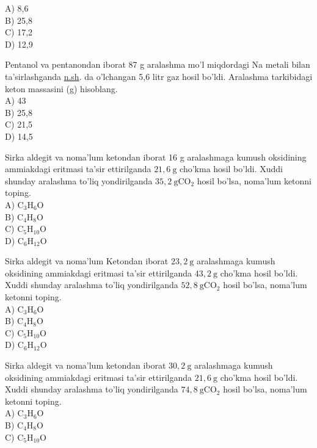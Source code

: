 A) 8,6\\
B) 25,8\\
C) 17,2\\
D) 12,9
  \item Pentanol va pentanondan iborat 87 g aralashma mo'l miqdordagi Na metali bilan ta'sirlashganda \href{http://n.sh}{n.sh}. da o'lchangan 5,6 litr gaz hosil bo'ldi. Aralashma tarkibidagi keton massasini (g) hisoblang.\\
A) 43\\
B) 25,8\\
C) 21,5\\
D) 14,5
  \item Sirka aldegit va noma'lum ketondan iborat 16 g aralashmaga kumush oksidining ammiakdagi eritmasi ta'sir ettirilganda $21,6 \mathrm{~g}$ cho'kma hosil bo'ldi. Xuddi shunday aralashma to'liq yondirilganda $35,2 \mathrm{~g} \mathrm{CO}_{2}$ hosil bo'lsa, noma'lum ketonni toping.\\
A) $\mathrm{C}_{3} \mathrm{H}_{6} \mathrm{O}$\\
B) $\mathrm{C}_{4} \mathrm{H}_{8} \mathrm{O}$\\
C) $\mathrm{C}_{5} \mathrm{H}_{10} \mathrm{O}$\\
D) $\mathrm{C}_{6} \mathrm{H}_{12} \mathrm{O}$
  \item Sirka aldegit va noma'lum Ketondan iborat $23,2 \mathrm{~g}$ aralashmaga kumush oksidining ammiakdagi eritmasi ta'sir ettirilganda $43,2 \mathrm{~g}$ cho'kma hosil bo'ldi. Xuddi shunday aralashma to'liq yondirilganda $52,8 \mathrm{~g} \mathrm{CO}_{2}$ hosil bo'lsa, noma'lum ketonni toping.\\
A) $\mathrm{C}_{3} \mathrm{H}_{6} \mathrm{O}$\\
B) $\mathrm{C}_{4} \mathrm{H}_{8} \mathrm{O}$\\
C) $\mathrm{C}_{5} \mathrm{H}_{10} \mathrm{O}$\\
D) $\mathrm{C}_{6} \mathrm{H}_{12} \mathrm{O}$
  \item Sirka aldegit va noma'lum ketondan iborat $30,2 \mathrm{~g}$ aralashmaga kumush oksidining ammiakdagi eritmasi ta'sir ettirilganda $21,6 \mathrm{~g}$ cho'kma hosil bo'ldi. Xuddi shunday aralashma to'liq yondirilganda $74,8 \mathrm{~g} \mathrm{CO}_{2}$ hosil bo'lsa, noma'lum ketonni toping.\\
A) $\mathrm{C}_{3} \mathrm{H}_{6} \mathrm{O}$\\
B) $\mathrm{C}_{4} \mathrm{H}_{8} \mathrm{O}$\\
C) $\mathrm{C}_{5} \mathrm{H}_{10} \mathrm{O}$\\
